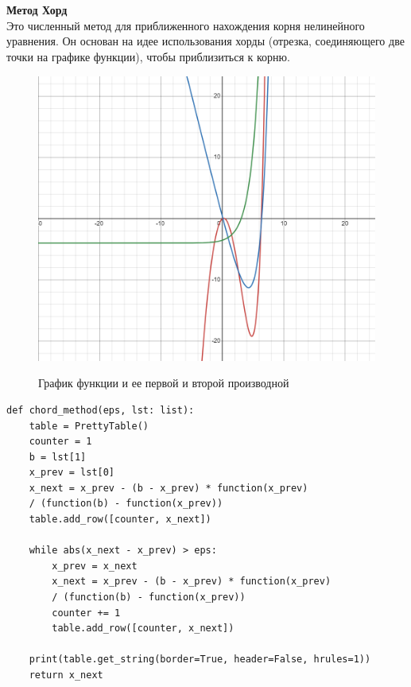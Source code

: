 \documentclass{article}
\begin{document}
\section*{}

\textbf{\large{Метод Хорд}} \\
    Это численный метод для приближенного нахождения корня нелинейного уравнения. Он основан на идее использования хорды (отрезка, соединяющего две точки на графике функции), чтобы приблизиться к корню.
\begin{figure}[H]
    \centering
    \includegraphics[width=\textwidth]{lab_7_1.png}
    \label{fig:my_label}
    \caption{График функции и ее первой и второй производной}
\end{figure}
\begin{lstlisting}
def chord_method(eps, lst: list):
    table = PrettyTable()
    counter = 1
    b = lst[1]
    x_prev = lst[0]
    x_next = x_prev - (b - x_prev) * function(x_prev) 
    / (function(b) - function(x_prev))
    table.add_row([counter, x_next])

    while abs(x_next - x_prev) > eps:
        x_prev = x_next
        x_next = x_prev - (b - x_prev) * function(x_prev) 
        / (function(b) - function(x_prev))
        counter += 1
        table.add_row([counter, x_next])

    print(table.get_string(border=True, header=False, hrules=1))
    return x_next

\end{lstlisting}
\end{document}
